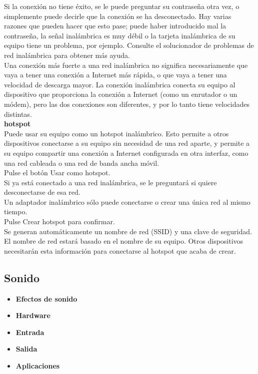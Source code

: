 \documentclass[12pt,letterpaper]{book}
\begin{document}
\begin{itemize}
Si la conexión no tiene éxito, se le puede preguntar su contraseña otra vez, o simplemente puede decirle que la conexión se ha desconectado. Hay varias razones que pueden hacer que esto pase; puede haber introducido mal la contraseña, la señal inalámbrica es muy débil o la tarjeta inalámbrica de su equipo tiene un problema, por ejemplo. Consulte el solucionador de problemas de red inalámbrica para obtener más ayuda.\\

Una conexión más fuerte a una red inalámbrica no significa necesariamente que vaya a tener una conexión a Internet más rápida, o que vaya a tener una velocidad de descarga mayor. La conexión inalámbrica conecta su equipo al dispositivo que proporciona la conexión a Internet (como un enrutador o un módem), pero las dos conexiones son diferentes, y por lo tanto tiene velocidades distintas.\\

{\large \bf hotspot}\\
Puede usar su equipo como un hotspot inalámbrico. Esto permite a otros dispositivos conectarse a su equipo sin necesidad de una red aparte, y permite a su equipo compartir una conexión a Internet configurada en otra interfaz, como una red cableada o una red de banda ancha móvil.\\

Pulse el botón Usar como hotspot.\\
Si ya está conectado a una red inalámbrica, se le preguntará si quiere desconectarse de esa red.\\
Un adaptador inalámbrico sólo puede conectarse o crear una única red al mismo tiempo.\\
Pulse Crear hotspot para confirmar.\\

Se generan automáticamente un nombre de red (SSID) y una clave de seguridad. El nombre de red estará basado en el nombre de su equipo. Otros dispositivos necesitarán esta información para conectarse al hotspot que acaba de crear.
\end{itemize}
\subsection{Sonido}
\begin{itemize}
\item{\bf Efectos de sonido}\\
\item{\bf Hardware}\\
\item{\bf Entrada}\\
\item{\bf Salida}\\
\item{\bf Aplicaciones}\\
\end{itemize}
\end{document}
